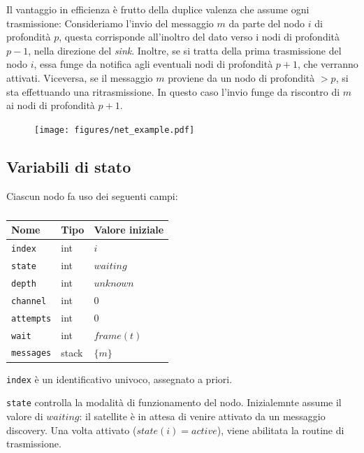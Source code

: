 \documentclass[a4paper,12pt]{article}
\theoremstyle{definition}
\begin{document}
Il vantaggio in efficienza è frutto della duplice valenza che assume ogni trasmissione: Consideriamo l'invio del messaggio $m$ da parte del nodo $i$ di profondità $p$, questa corrisponde all'inoltro del dato verso i nodi di profondità $p-1$, nella direzione del \emph{sink}. Inoltre, se si tratta della prima trasmissione del nodo $i$, essa funge da notifica agli eventuali nodi di profondità $p+1$, che verranno attivati. Viceversa, se il messaggio $m$ proviene da un nodo di profondità $> p$, si sta effettuando una ritrasmissione. In questo caso l'invio funge da riscontro di $m$ ai nodi di profondità $p+1$.

\begin{figure}[H]
\centering
\texttt{[image: figures/net\_example.pdf]}
\caption{}
\end{figure}

\subsection{Variabili di stato}

Ciascun nodo fa uso dei seguenti campi:

\begin{table}[H]
\centering
\begin{tabular}{| l | l | l |}
\multicolumn{1}{l}{Nome} &
\multicolumn{1}{l}{Tipo} &
\multicolumn{1}{l}{Valore iniziale} \\ \hline
\texttt{index} & int & $i$ \\ \hline
\texttt{state} & int & $waiting$ \\ \hline
\texttt{depth} & int & $unknown$ \\ \hline
\texttt{channel} & int & $0$ \\ \hline
\texttt{attempts} & int & $0$ \\ \hline
\texttt{wait} & int & $frame(t)$ \\ \hline
\texttt{messages} & stack & $\{m\}$ \\ \hline
\end{tabular}
\caption{}
\end{table}

\texttt{index} è un identificativo univoco, assegnato a priori.

\texttt{state} controlla la modalità di funzionamento del nodo. Inizialemnte assume il valore di $waiting$: il satellite è in attesa di venire attivato da un messaggio discovery. Una volta attivato ($state(i) = active$), viene abilitata la routine di trasmissione.
\end{document}
